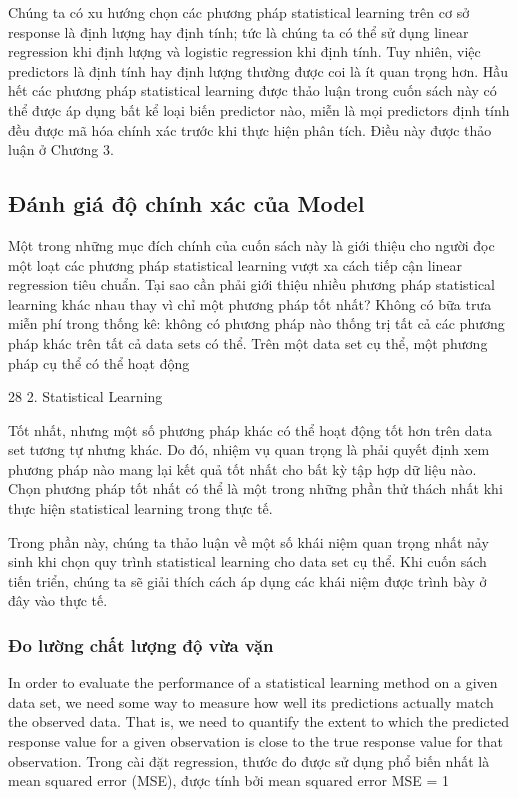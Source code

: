 Chúng ta có xu hướng chọn các phương pháp statistical learning trên cơ sở response là định lượng hay định tính; tức là chúng ta có thể sử dụng linear regression khi định lượng và logistic regression khi định tính. Tuy nhiên, việc predictors là định tính hay định lượng thường được coi là ít quan trọng hơn. Hầu hết các phương pháp statistical learning được thảo luận trong cuốn sách này có thể được áp dụng bất kể loại biến predictor nào, miễn là mọi predictors định tính đều được mã hóa chính xác trước khi thực hiện phân tích. Điều này được thảo luận ở Chương 3.

\subsection{Đánh giá độ chính xác của Model}

Một trong những mục đích chính của cuốn sách này là giới thiệu cho người đọc một loạt các phương pháp statistical learning vượt xa cách tiếp cận linear regression tiêu chuẩn. Tại sao cần phải giới thiệu nhiều phương pháp statistical learning khác nhau thay vì chỉ một phương pháp tốt nhất? Không có bữa trưa miễn phí trong thống kê: không có phương pháp nào thống trị tất cả các phương pháp khác trên tất cả data sets có thể. Trên một data set cụ thể, một phương pháp cụ thể có thể hoạt động

28 2. Statistical Learning

Tốt nhất, nhưng một số phương pháp khác có thể hoạt động tốt hơn trên data set tương tự nhưng khác. Do đó, nhiệm vụ quan trọng là phải quyết định xem phương pháp nào mang lại kết quả tốt nhất cho bất kỳ tập hợp dữ liệu nào. Chọn phương pháp tốt nhất có thể là một trong những phần thử thách nhất khi thực hiện statistical learning trong thực tế.

Trong phần này, chúng ta thảo luận về một số khái niệm quan trọng nhất nảy sinh khi chọn quy trình statistical learning cho data set cụ thể. Khi cuốn sách tiến triển, chúng ta sẽ giải thích cách áp dụng các khái niệm được trình bày ở đây vào thực tế.

\subsubsection{Đo lường chất lượng độ vừa vặn}

In order to evaluate the performance of a statistical learning method on a given data set, we need some way to measure how well its predictions actually match the observed data. That is, we need to quantify the extent to which the predicted response value for a given observation is close to the true response value for that observation. Trong cài đặt regression, thước đo được sử dụng phổ biến nhất là mean squared error (MSE), được tính bởi mean squared error MSE = 1

